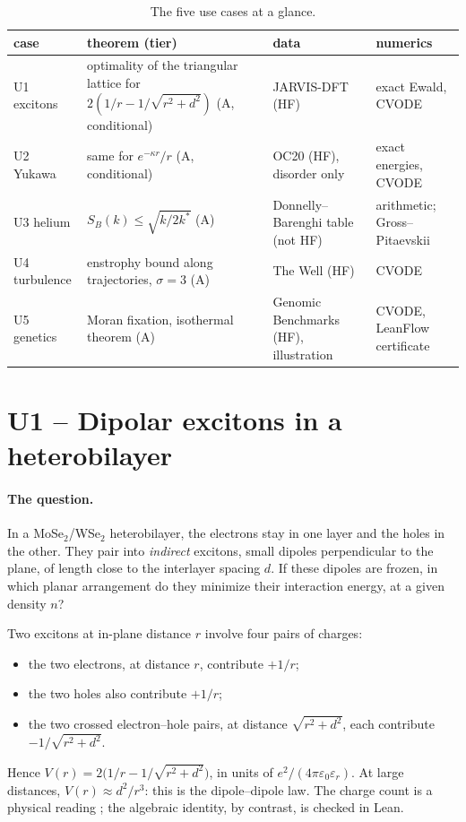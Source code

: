 \begin{table}[ht]\centering\small
\caption{The five use cases at a glance.}\label{ch5:tab:resume}
\begin{tabular}{p{2.2cm}p{3.6cm}p{3.4cm}p{4.2cm}}\toprule
case & theorem (tier) & data & numerics\\\midrule
U1 excitons & optimality of the triangular lattice for $2(1/r-1/\sqrt{r^2+d^2})$ (A, conditional) &
JARVIS-DFT (HF) & exact Ewald, CVODE \\
U2 Yukawa & same for $e^{-\kappa r}/r$ (A, conditional) & OC20 (HF), disorder only & exact energies, CVODE\\
U3 helium & $S_B(k)\le\sqrt{k/2k^*}$ (A) & Donnelly--Barenghi table (not HF) & arithmetic; Gross--Pitaevskii\\
U4 turbulence & enstrophy bound along trajectories, $\sigma=3$ (A) & The Well (HF) & CVODE\\
U5 genetics & Moran fixation, isothermal theorem (A) & Genomic Benchmarks (HF), illustration & CVODE, LeanFlow certificate\\
\bottomrule\end{tabular}
\end{table}

\section{U1 -- Dipolar excitons in a heterobilayer}\label{ch5:U1}

\paragraph{The question.} In a MoSe$_2$/WSe$_2$ heterobilayer, the electrons stay in one layer and the
holes in the other. They pair into \emph{indirect} excitons, small dipoles perpendicular to the plane, of
length close to the interlayer spacing $d$. If these dipoles are frozen, in which planar arrangement do they minimize their
interaction energy, at a given density $n$?

\begin{physbox}
Two excitons at in-plane distance $r$ involve four pairs of charges:
\begin{itemize}
\item the two electrons, at distance $r$, contribute $+1/r$;
\item the two holes also contribute $+1/r$;
\item the two crossed electron--hole pairs, at distance $\sqrt{r^2+d^2}$, each contribute
$-1/\sqrt{r^2+d^2}$.
\end{itemize}
Hence $V(r)=2\bigl(1/r-1/\sqrt{r^2+d^2}\bigr)$, in units of $e^2/(4\pi\varepsilon_0\varepsilon_r)$. At large
distances, $V(r)\approx d^2/r^3$: this is the dipole--dipole law. The charge count is a physical
reading \tierC{}; the algebraic identity, by contrast, is checked in Lean.
\end{physbox}

